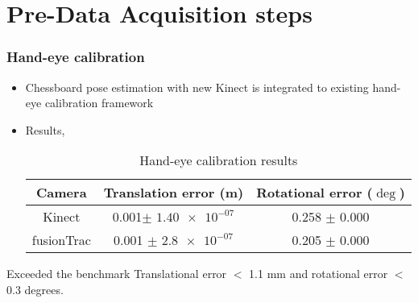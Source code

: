 \section{Pre-Data Acquisition steps}
\begin{frame}
	\frametitle{Hand-eye calibration}
	\begin{itemize}
		\item Chessboard pose estimation with new Kinect is integrated to existing hand-eye calibration framework
		\item Results,
		\begin{table}[hbt!]
			\centering
			\begin{tabular}{|c|c|c|}
				\hline
				Camera & Translation error (m) & Rotational error ($\deg$)\\ 
				\hline
				Kinect & 0.001$\pm$ $\num{1.40e-07}$  & 0.258 $\pm$ $\num{0.000}$\\
				fusionTrac & 0.001 $\pm$ $\num{2.8e-07}$  & 0.205 $\pm$ $\num{0.000}$\\
				\hline
			\end{tabular}
			\caption{Hand-eye calibration results}
			\label{tab:kinect__fusionTrac_handeye_result}
		\end{table}
	\end{itemize}
\begin{block}{Exceeded the benchmark }
	Translational error $<$ 1.1 mm and rotational error  $<$ 0.3 degrees.
\end{block}
		
\end{frame}